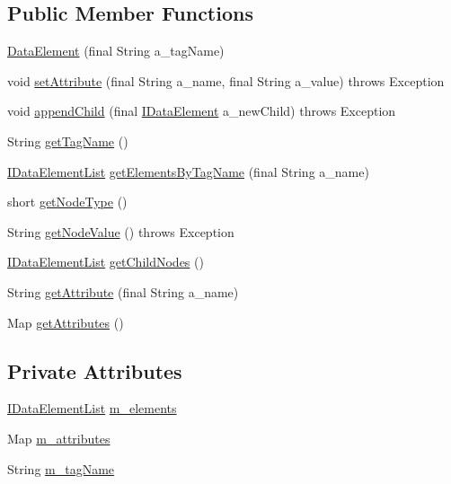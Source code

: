 \subsection*{Public Member Functions}
\begin{DoxyCompactItemize}
\item 
\hyperlink{classorg_1_1jgap_1_1data_1_1_data_element_a688397fbffe79854007fe18ec8616157}{Data\-Element} (final String a\-\_\-tag\-Name)
\item 
void \hyperlink{classorg_1_1jgap_1_1data_1_1_data_element_a1b1147703a6ee01775da2a6a0d7c536e}{set\-Attribute} (final String a\-\_\-name, final String a\-\_\-value)  throws Exception 
\item 
void \hyperlink{classorg_1_1jgap_1_1data_1_1_data_element_a5a8bb19eda5444e68f3beefc5c20073c}{append\-Child} (final \hyperlink{interfaceorg_1_1jgap_1_1data_1_1_i_data_element}{I\-Data\-Element} a\-\_\-new\-Child)  throws Exception 
\item 
String \hyperlink{classorg_1_1jgap_1_1data_1_1_data_element_a0a15c575086f45cb293efbd47272d632}{get\-Tag\-Name} ()
\item 
\hyperlink{interfaceorg_1_1jgap_1_1data_1_1_i_data_element_list}{I\-Data\-Element\-List} \hyperlink{classorg_1_1jgap_1_1data_1_1_data_element_a8eadcc49b4a73417d5e30824a3fba27c}{get\-Elements\-By\-Tag\-Name} (final String a\-\_\-name)
\item 
short \hyperlink{classorg_1_1jgap_1_1data_1_1_data_element_ac3c28d3af77b3d28c098f89fda44164d}{get\-Node\-Type} ()
\item 
String \hyperlink{classorg_1_1jgap_1_1data_1_1_data_element_ac0087a40c0b5e19b5d23d5d8414646a0}{get\-Node\-Value} ()  throws Exception 
\item 
\hyperlink{interfaceorg_1_1jgap_1_1data_1_1_i_data_element_list}{I\-Data\-Element\-List} \hyperlink{classorg_1_1jgap_1_1data_1_1_data_element_a308f0a5305163ee2519a0c22b3f5b1de}{get\-Child\-Nodes} ()
\item 
String \hyperlink{classorg_1_1jgap_1_1data_1_1_data_element_adbc8d9b37f6338c85109e0d07cff1fb8}{get\-Attribute} (final String a\-\_\-name)
\item 
Map \hyperlink{classorg_1_1jgap_1_1data_1_1_data_element_a24000d413014efefa8e446e1eb8c461b}{get\-Attributes} ()
\end{DoxyCompactItemize}
\subsection*{Private Attributes}
\begin{DoxyCompactItemize}
\item 
\hyperlink{interfaceorg_1_1jgap_1_1data_1_1_i_data_element_list}{I\-Data\-Element\-List} \hyperlink{classorg_1_1jgap_1_1data_1_1_data_element_a821a2c013941bea9fe9df89d46bcee28}{m\-\_\-elements}
\item 
Map \hyperlink{classorg_1_1jgap_1_1data_1_1_data_element_a2bc614ef2a9e58775bbc30d4e6df1c07}{m\-\_\-attributes}
\item 
String \hyperlink{classorg_1_1jgap_1_1data_1_1_data_element_a9c0b23343bbaaff585142c35b0c72173}{m\-\_\-tag\-Name}
\end{DoxyCompactItemize}
